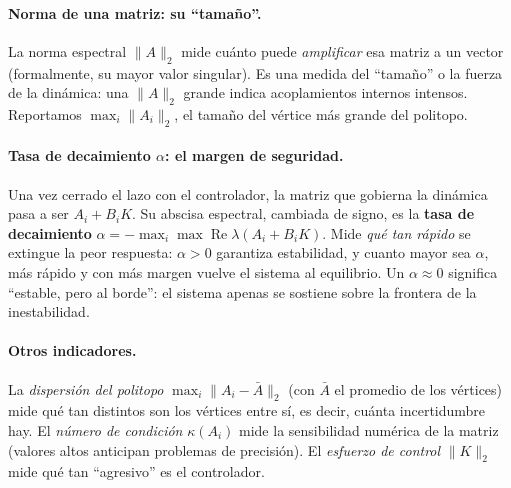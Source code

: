 \paragraph{Norma de una matriz: su ``tamaño''.}
La norma espectral $\lVert A\rVert_2$ mide cuánto puede \emph{amplificar} esa
matriz a un vector (formalmente, su mayor valor singular). Es una medida del
``tamaño'' o la fuerza de la dinámica: una $\lVert A\rVert_2$ grande indica
acoplamientos internos intensos. Reportamos $\max_i\lVert A_i\rVert_2$, el
tamaño del vértice más grande del politopo.

\paragraph{Tasa de decaimiento $\alpha$: el margen de seguridad.}
Una vez cerrado el lazo con el controlador, la matriz que gobierna la dinámica
pasa a ser $A_i+B_iK$. Su abscisa espectral, cambiada de signo, es la
\textbf{tasa de decaimiento}
$\alpha=-\max_i\max\operatorname{Re}\lambda(A_i+B_iK)$. Mide \emph{qué tan
rápido} se extingue la peor respuesta: $\alpha>0$ garantiza estabilidad, y
cuanto mayor sea $\alpha$, más rápido y con más margen vuelve el sistema al
equilibrio. Un $\alpha\approx0$ significa ``estable, pero al borde'': el sistema
apenas se sostiene sobre la frontera de la inestabilidad.

\paragraph{Otros indicadores.}
La \emph{dispersión del politopo} $\max_i\lVert A_i-\bar A\rVert_2$ (con $\bar A$
el promedio de los vértices) mide qué tan distintos son los vértices entre sí,
es decir, cuánta incertidumbre hay. El \emph{número de condición} $\kappa(A_i)$
mide la sensibilidad numérica de la matriz (valores altos anticipan problemas de
precisión). El \emph{esfuerzo de control} $\lVert K\rVert_2$ mide qué tan
``agresivo'' es el controlador.

